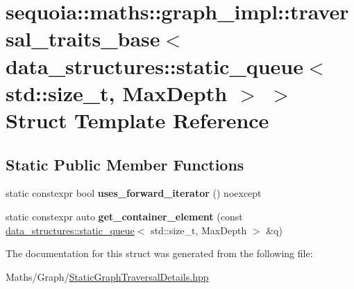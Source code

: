\hypertarget{structsequoia_1_1maths_1_1graph__impl_1_1traversal__traits__base_3_01data__structures_1_1static_55ca7b9f0a1572cd63e5121ccf03218a}{}\section{sequoia\+::maths\+::graph\+\_\+impl\+::traversal\+\_\+traits\+\_\+base$<$ data\+\_\+structures\+::static\+\_\+queue$<$ std\+::size\+\_\+t, Max\+Depth $>$ $>$ Struct Template Reference}
\label{structsequoia_1_1maths_1_1graph__impl_1_1traversal__traits__base_3_01data__structures_1_1static_55ca7b9f0a1572cd63e5121ccf03218a}
\subsection*{Static Public Member Functions}
\begin{DoxyCompactItemize}
\item 
\mbox{\label{structsequoia_1_1maths_1_1graph__impl_1_1traversal__traits__base_3_01data__structures_1_1static_55ca7b9f0a1572cd63e5121ccf03218a_ab9a51f807b955f054b2117d67f7f9baa}} 
static constexpr bool {\bfseries uses\+\_\+forward\+\_\+iterator} () noexcept
\item 
\mbox{\label{structsequoia_1_1maths_1_1graph__impl_1_1traversal__traits__base_3_01data__structures_1_1static_55ca7b9f0a1572cd63e5121ccf03218a_a116f4b0f7ffd551a806fa23f7d40f20b}} 
static constexpr auto {\bfseries get\+\_\+container\+\_\+element} (const \mbox{\hyperlink{classsequoia_1_1data__structures_1_1static__queue}{data\+\_\+structures\+::static\+\_\+queue}}$<$ std\+::size\+\_\+t, Max\+Depth $>$ \&q)
\end{DoxyCompactItemize}


The documentation for this struct was generated from the following file\+:\begin{DoxyCompactItemize}
\item 
Maths/\+Graph/\mbox{\hyperlink{_static_graph_traversal_details_8hpp}{Static\+Graph\+Traversal\+Details.\+hpp}}\end{DoxyCompactItemize}
